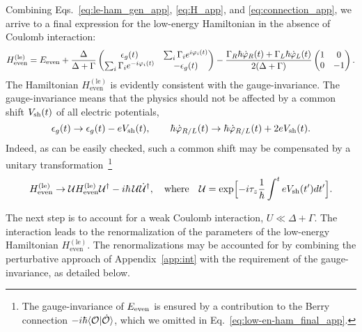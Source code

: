 \documentclass[aps,reprint,longbibliography, prb]{revtex4-2}
\begin{document}
Combining Eqs.~\eqref{eq:le-ham_gen_app}, \eqref{eq:H_app}, and \eqref{eq:connection_app}, we arrive to a final expression for the low-energy Hamiltonian in the absence of Coulomb interaction:
\begin{equation}\label{eq:low-en-ham_final_app}
    H_\mathrm{even}^{\mathrm{(le)}} = E_{\rm even} + \frac{\Delta}{\Delta + \Gamma}
    \begin{pmatrix}
    \epsilon_g(t) & \sum_i\Gamma_i e^{i\varphi_i (t)}\\
    \sum_i\Gamma_i e^{-i\varphi_i(t)} & -\epsilon_g(t)
    \end{pmatrix} 
    - \frac{\Gamma_R \hbar\dot{\varphi}_R(t) + \Gamma_L \hbar\dot{\varphi}_L(t)}{2(\Delta + \Gamma)}
    \begin{pmatrix}
    1 & 0 \\
    0 & -1
    \end{pmatrix}.
\end{equation}
The Hamiltonian $H_\mathrm{even}^{\mathrm{(le)}}$ is evidently consistent with the gauge-invariance. The gauge-invariance means that the physics should not be affected by a common shift $V_{\rm sh}(t)$ of all electric potentials,
\begin{equation}\label{eq:gauge1_app}
    \epsilon_g(t) \rightarrow \epsilon_g(t) - e V_{\rm sh}(t),\quad\quad \hbar\dot{\varphi}_{R/L}(t) \rightarrow \hbar\dot{\varphi}_{R/L}(t) + 2e V_{\rm sh}(t). 
\end{equation}
Indeed, as can be easily checked, such a common shift may be compensated by a unitary transformation~\footnote{The gauge-invariance of $E_{\rm even}$ is ensured by a contribution to the Berry connection $-i\hbar \langle {\cal O}|\dot{{\cal O}}\rangle$, which we omitted in Eq.~\eqref{eq:low-en-ham_final_app}.}
\begin{equation}\label{eq:gauge2_app}
    H_\mathrm{even}^{\mathrm{(le)}} \rightarrow {\cal U}H_\mathrm{even}^{\mathrm{(le)}} {\cal U}^\dagger - i\hbar\,{\cal U} \dot{\cal{U}}^\dagger, \quad \text{where} \quad {\cal U} = \exp \Bigl[-i\tau_z \frac{1}{\hbar}\int^t e V_{\rm sh}(t^\prime) dt^\prime \Bigr].
\end{equation}

The next step is to account for a weak Coulomb interaction, $U \ll \Delta + \Gamma$. The interaction leads to the renormalization of the parameters of the low-energy Hamiltonian $H_\mathrm{even}^{\mathrm{(le)}}$. The renormalizations may be accounted for by combining the perturbative approach of Appendix~\ref{app:int} with the requirement of the gauge-invariance, as detailed below.
\end{document}
